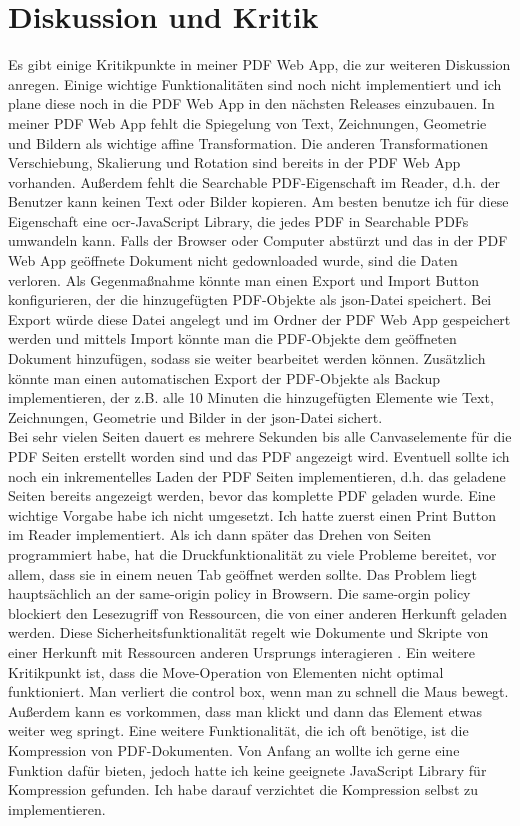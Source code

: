 \chapter{Diskussion und Kritik}
Es gibt einige Kritikpunkte in meiner PDF Web App, die zur weiteren Diskussion anregen. Einige wichtige Funktionalitäten sind noch nicht implementiert und ich plane diese noch in die PDF Web App in den nächsten Releases einzubauen. In meiner PDF Web App fehlt die Spiegelung von Text, Zeichnungen, Geometrie und Bildern als wichtige affine Transformation. Die anderen Transformationen Verschiebung, Skalierung und Rotation sind bereits in der PDF Web App vorhanden. Außerdem fehlt die Searchable PDF-Eigenschaft im Reader, d.h. der Benutzer kann keinen Text oder Bilder kopieren. Am besten benutze ich für diese Eigenschaft eine \gls{ocr}-JavaScript Library, die jedes PDF in Searchable PDFs umwandeln kann. Falls der Browser oder Computer abstürzt und das in der PDF Web App geöffnete Dokument nicht gedownloaded wurde, sind die Daten verloren. Als Gegenmaßnahme könnte man einen Export und Import Button konfigurieren, der die hinzugefügten PDF-Objekte als \gls{json}-Datei speichert. Bei Export würde diese Datei angelegt und im Ordner der PDF Web App gespeichert werden und mittels Import könnte man die PDF-Objekte dem geöffneten Dokument hinzufügen, sodass sie weiter bearbeitet werden können. Zusätzlich könnte man einen automatischen Export der PDF-Objekte als Backup implementieren, der z.B. alle 10 Minuten die hinzugefügten Elemente wie Text, Zeichnungen, Geometrie und Bilder in der \gls{json}-Datei sichert. \\
Bei sehr vielen Seiten dauert es mehrere Sekunden bis alle Canvaselemente für die PDF Seiten erstellt worden sind und das PDF angezeigt wird. Eventuell sollte ich noch ein inkrementelles Laden der PDF Seiten implementieren, d.h. das geladene Seiten bereits angezeigt werden, bevor das komplette PDF geladen wurde. Eine wichtige Vorgabe habe ich nicht umgesetzt. Ich hatte zuerst einen Print Button im Reader implementiert. Als ich dann später das Drehen von Seiten programmiert habe, hat die Druckfunktionalität zu viele Probleme bereitet, vor allem, dass sie in einem neuen Tab geöffnet werden sollte. Das Problem liegt hauptsächlich an der same-origin policy in Browsern. Die same-orgin policy blockiert den Lesezugriff von Ressourcen, die von einer anderen Herkunft geladen werden. Diese Sicherheitsfunktionalität regelt wie Dokumente und Skripte von einer Herkunft mit Ressourcen anderen Ursprungs interagieren \cite{same-origin}. Ein weitere Kritikpunkt ist, dass die Move-Operation von Elementen nicht optimal funktioniert. Man verliert die control box, wenn man zu schnell die Maus bewegt. Außerdem kann es vorkommen, dass man klickt und dann das Element etwas weiter weg springt. Eine weitere Funktionalität, die ich oft benötige, ist die Kompression von PDF-Dokumenten. Von Anfang an wollte ich gerne eine Funktion dafür bieten, jedoch hatte ich keine geeignete JavaScript Library für Kompression gefunden. Ich habe darauf verzichtet die Kompression selbst zu implementieren. \\
